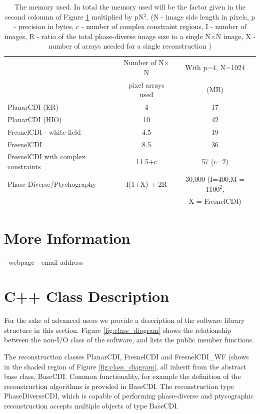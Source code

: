 \documentclass[]{cxs-software}
\begin{document}
\begin{table}[h!]
\begin{tabular}[h!]{lcc}
\toprule
&  Number of N$\times$N & With p=4, N=1024 \\
&  pixel arrays used & (MB) \\
\midrule
PlanarCDI (ER) & 4 & 17 \\
PlanarCDI (HIO) & 10 & 42  \\
FresnelCDI - white field & 4.5 & 19 \\
FresnelCDI & 8.5 & 36 \\
FresnelCDI with complex constraints & 11.5+c & 57 (c=2) \\
Phase-Diverse/Ptychography & I(1+X) + 2R & 30,000 (I=400,M = 1100$^2$, \\
 &                 & X = FresnelCDI)  \\
\bottomrule
\end{tabular}

\caption{\label{table:memory}The memory used. 
In total the memory used will be the factor given in the second
coloumn of Figure \ref{table:memory} multiplied by pN$^2$.
(N - image side length in pixels, p - precision in bytes, 
c - number of complex constraint regions, I - number of images, 
R - ratio of the total phase-diverse image size to a single N$\times$N image,
X - number of arrays needed for a single reconstruction ) 
}
\end{table}


\section{More Information}

- webpage
- email address


\newpage

\appendix

\section{C++ Class Description} 

For the sake of advanced users we provide a description of the
software library structure in this section. Figure
\ref{fig:class_diagram} shows the relationship between the non-I/O
class of the software, and lists the public member functions.

The reconstruction classes PlanarCDI, FresnelCDI and FresnelCDI\_WF
(shows in the shaded region of Figure \ref{fig:class_diagram}, all
inherit from the abstract base class, BaseCDI. Common functionality,
for example the definition of the reconstruction algorithms is
provided in BaseCDI. The reconstruction type PhaseDiverseCDI, which is
capable of performing phase-diverse and ptycographic reconstruction
accepts multiple objects of type BaseCDI.
\end{document}
